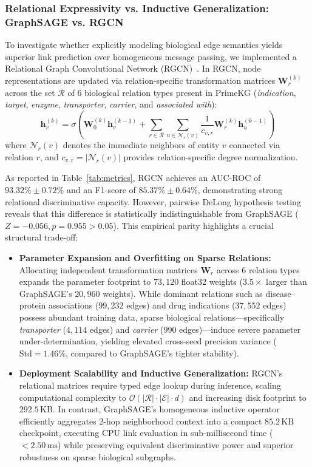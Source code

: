 \documentclass[preprint,12pt]{elsarticle}
\begin{document}
\subsubsection{Relational Expressivity vs. Inductive Generalization: GraphSAGE vs. RGCN}
To investigate whether explicitly modeling biological edge semantics yields superior link prediction over homogeneous message passing, we implemented a Relational Graph Convolutional Network (RGCN)~\cite{ref_rgcn}. In RGCN, node representations are updated via relation-specific transformation matrices $\mathbf{W}_r^{(k)}$ across the set $\mathcal{R}$ of 6 biological relation types present in PrimeKG (\textit{indication}, \textit{target}, \textit{enzyme}, \textit{transporter}, \textit{carrier}, and \textit{associated with}):
\begin{equation}
\mathbf{h}_v^{(k)} = \sigma \left( \mathbf{W}_0^{(k)} \mathbf{h}_v^{(k-1)} + \sum_{r \in \mathcal{R}} \sum_{u \in \mathcal{N}_r(v)} \frac{1}{c_{v,r}} \mathbf{W}_r^{(k)} \mathbf{h}_u^{(k-1)} \right)
\end{equation}
where $\mathcal{N}_r(v)$ denotes the immediate neighbors of entity $v$ connected via relation $r$, and $c_{v,r} = |\mathcal{N}_r(v)|$ provides relation-specific degree normalization.

As reported in Table~\ref{tab:metrics}, RGCN achieves an AUC-ROC of $93.32\% \pm 0.72\%$ and an F1-score of $85.37\% \pm 0.64\%$, demonstrating strong relational discriminative capacity. However, pairwise DeLong hypothesis testing reveals that this difference is statistically indistinguishable from GraphSAGE ($Z = -0.056, p = 0.955 > 0.05$). This empirical parity highlights a crucial structural trade-off:
\begin{itemize}
    \item \textbf{Parameter Expansion and Overfitting on Sparse Relations:} Allocating independent transformation matrices $\mathbf{W}_r$ across 6 relation types expands the parameter footprint to $73,120$ float32 weights ($3.5\times$ larger than GraphSAGE's $20,960$ weights). While dominant relations such as disease--protein associations ($99,232$ edges) and drug indications ($37,552$ edges) possess abundant training data, sparse biological relations—specifically \textit{transporter} ($4,114$ edges) and \textit{carrier} ($990$ edges)—induce severe parameter under-determination, yielding elevated cross-seed precision variance ($\text{Std} = 1.46\%$, compared to GraphSAGE's tighter stability).
    \item \textbf{Deployment Scalability and Inductive Generalization:} RGCN's relational matrices require typed edge lookup during inference, scaling computational complexity to $\mathcal{O}(|\mathcal{R}| \cdot |\mathcal{E}| \cdot d)$ and increasing disk footprint to $292.5\,\mathrm{KB}$. In contrast, GraphSAGE's homogeneous inductive operator efficiently aggregates 2-hop neighborhood context into a compact $85.2\,\mathrm{KB}$ checkpoint, executing CPU link evaluation in sub-millisecond time ($<2.50\,\mathrm{ms}$) while preserving equivalent discriminative power and superior robustness on sparse biological subgraphs.
\end{itemize}
\end{document}
